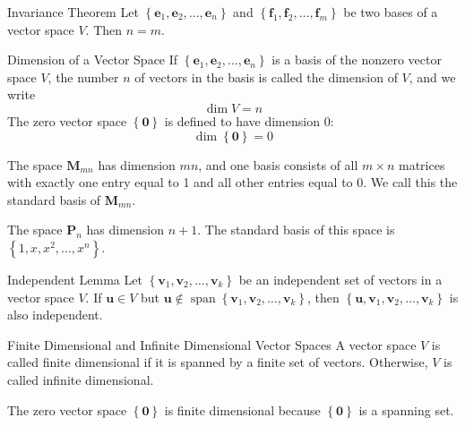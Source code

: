\documentclass[12pt]{article}
\begin{document}
\begin{theorem}{Invariance Theorem}{}
    Let $ \left\{ \mathbf{e}_1, \mathbf{e}_2, \dots, \mathbf{e}_n \right\} $ and $ \left\{ \mathbf{f}_1, \mathbf{f}_2, \dots, \mathbf{f}_m \right\} $ be two bases of a vector space $ V $. Then $ n = m $.
\end{theorem}

\begin{definition}{Dimension of a Vector Space}{}
    If $ \left\{ \mathbf{e}_1, \mathbf{e}_2, \dots, \mathbf{e}_n \right\} $ is a basis of the nonzero vector space $ V $, the number $ n $ of vectors in the basis is called the dimension of $ V $, and we write
    \[ \dim V = n \]
    The zero vector space $ \left\{ \mathbf{0} \right\} $ is defined to have dimension 0:
    \[ \dim \left\{ \mathbf{0} \right\} = 0 \]
\end{definition}

\begin{note}{}{}
    The space $ \mathbf{M}_{mn} $ has dimension $ mn $, and one basis consists of all $ m \times n $ matrices with exactly one entry equal to 1 and all other entries equal to 0. We call this the standard basis of $ \mathbf{M}_{mn} $.
\end{note}

\begin{note}{}{}
    The space $ \mathbf{P}_n $ has dimension $ n + 1 $. The standard basis of this space is $ \left\{ 1, x, x^2, \dots, x^n \right\} $.
\end{note}

\begin{lemma}{Independent Lemma}{}
    Let $ \left\{ \mathbf{v}_1, \mathbf{v}_2, \dots, \mathbf{v}_k \right\} $ be an independent set of vectors in a vector space $ V $. If $ \mathbf{u} \in V $ but $ \mathbf{u} \notin \operatorname{span} \left\{ \mathbf{v}_1, \mathbf{v}_2, \dots, \mathbf{v}_k \right\} $, then $ \left\{ \mathbf{u}, \mathbf{v}_1, \mathbf{v}_2, \dots, \mathbf{v}_k \right\} $ is also independent.
\end{lemma}

\begin{definition}{Finite Dimensional and Infinite Dimensional Vector Spaces}{}
    A vector space $ V $ is called finite dimensional if it is spanned by a finite set of vectors. Otherwise, $ V $ is called infinite dimensional.
\end{definition}

\begin{note}{}{}
    The zero vector space $ \left\{ \mathbf{0} \right\} $ is finite dimensional because $ \left\{ \mathbf{0} \right\} $ is a spanning set.
\end{note}
\end{document}
